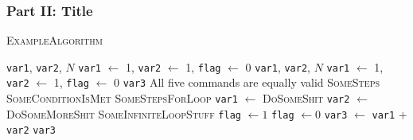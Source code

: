 \subsubsection{Part II: Title}
\begin{algorithm}[t]
	\caption{\textsc{ExampleAlgorithm}}\label{alg:1}
	\begin{algorithmic}[1]
		\Require \texttt{var1}, \texttt{var2}, $N$ 
		\Ensure \texttt{var1} $\gets$ 1, \texttt{var2} $\gets$ 1, \texttt{flag} $\gets$ 0 
		\Input \texttt{var1}, \texttt{var2}, $N$
		\Init \texttt{var1} $\gets$ 1, \texttt{var2} $\gets$ 1, \texttt{flag} $\gets$ 0 
		\Output \texttt{var3}
		\Comment All five commands are equally valid
		\Repeat {}
		\State \textsc{SomeSteps}
		\Until \textsc{SomeConditionIsMet}	
		 
		\State \textsc{SomeStepsForLoop}
		\EndFor
		 
		\State \texttt{var1} $\gets$ \textsc{DoSomeShit}
		\State \texttt{var2} $\gets$ \textsc{DoSomeMoreShit}
		\EndWhile
		\Loop {}
		\State \textsc{SomeInfiniteLoopStuff}
		\EndLoop
		\State \texttt{flag} $\gets 1$
		\State \texttt{flag} $\gets 0$
		\Else
		\State \texttt{var3} $\gets$ \texttt{var1} $+$ \texttt{var2}
		\EndIf
		\State {}
		\State \Return \texttt{var3}
	\end{algorithmic}
\end{algorithm}